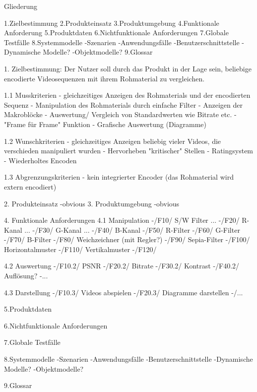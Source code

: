 Gliederung

1.Zielbestimmung
2.Produkteinsatz
3.Produktumgebung
4.Funktionale Anforderung
5.Produktdaten
6.Nichtfunktionale Anforderungen
7.Globale Testfälle
8.Systemmodelle
  -Szenarien
  -Anwendungsfälle
  -Benutzerschnittstelle
  -Dynamische Modelle?
  -Objektmodelle?
9.Glossar


1. Zielbestimmung:
Der Nutzer soll durch das Produkt in der Lage sein, beliebige encodierte Videosequenzen mit ihrem Rohmaterial zu vergleichen.
	
	1.1 Musskriterien
		- gleichzeitiges Anzeigen des Rohmaterials und der encodierten Sequenz
		- Manipulation des Rohmaterials durch einfache Filter
		- Anzeigen der Makroblöcke
		- Auswertung/ Vergleich von Standardwerten wie Bitrate etc.
		- "Frame für Frame" Funktion
		- Grafische Auswertung (Diagramme)		
		
	
	
	1.2 Wunschkriterien
		- gleichzeitiges Anzeigen beliebig vieler Videos, die verschieden manipuliert wurden
		- Hervorheben "kritischer" Stellen
		- Ratingsystem
		- Wiederholtes Encoden
		
		
		
	1.3 Abgrenzungskriterien
		- kein integrierter Encoder (das Rohmaterial wird extern encodiert)


2. Produkteinsatz  -obvious
3. Produktumgebung -obvious

4. Funktionale Anforderungen
	4.1 Manipulation
	-/F10/ S/W Filter ...
	-/F20/ R-Kanal ...
	-/F30/ G-Kanal ...
	-/F40/ B-Kanal
	-/F50/ R-Filter
	-/F60/ G-Filter
	-/F70/ B-Filter
	-/F80/ Weichzeichner (mit Regler?)
	-/F90/ Sepia-Filter
	-/F100/ Horizontalmuster
	-/F110/ Vertikalmuster
	-/F120/ 
	
	 
	
	4.2 Auswertung
	-/F10.2/ PSNR
	-/F20.2/ Bitrate
	-/F30.2/ Kontrast
	-/F40.2/ Auflösung?
	-...
		
		
	
	4.3 Darstellung
	-/F10.3/ Videos abspielen
	-/F20.3/ Diagramme darstellen
	-/...


5.Produktdaten

6.Nichtfunktionale Anforderungen

7.Globale Testfälle

	




8.Systemmodelle
  -Szenarien
  -Anwendungsfälle
  -Benutzerschnittstelle
  -Dynamische Modelle?
  -Objektmodelle?






9.Glossar
	

	
	
